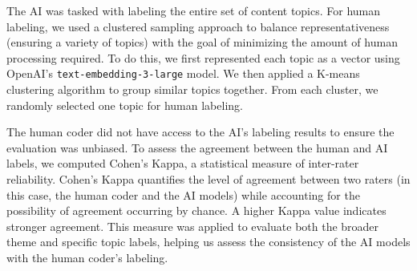 \documentclass[]{interact}
\theoremstyle{plain}%
\theoremstyle{definition}
\theoremstyle{remark}
\begin{document}
The AI was tasked with labeling the entire set of content topics. For human labeling, we used a	 clustered sampling approach to balance representativeness (ensuring a variety of topics) with the goal of minimizing the amount of human processing required. To do this, we first represented each topic as a vector using OpenAI’s \texttt{text-embedding-3-large} model. We then applied a K-means clustering algorithm to group similar topics together. From each cluster, we randomly selected one topic for human labeling. 


The human coder did not have access to the AI's labeling results to ensure the evaluation was unbiased. To assess the agreement between the human and AI labels, we computed Cohen’s Kappa, a statistical measure of inter-rater reliability. Cohen’s Kappa quantifies the level of agreement between two raters (in this case, the human coder and the AI models) while accounting for the possibility of agreement occurring by chance. A higher Kappa value indicates stronger agreement. This measure was applied to evaluate both the broader theme and specific topic labels, helping us assess the consistency of the AI models with the human coder’s labeling.





\end{document}
